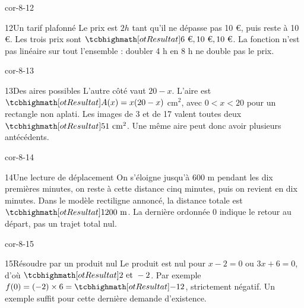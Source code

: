 \begin{blocLivre}{cor-8-12}\begin{corrige}{12}{Un tarif plafonné}
Le prix est $2h$ tant qu’il ne dépasse pas 10 €, puis reste à 10 €. Les trois prix sont $\res{6\text{ €},10\text{ €},10\text{ €}}$. La fonction n’est pas linéaire sur tout l’ensemble : doubler 4 h en 8 h ne double pas le prix.
\end{corrige}\end{blocLivre}
\begin{blocLivre}{cor-8-13}\begin{corrige}{13}{Des aires possibles}
L’autre côté vaut $20-x$. L’aire est $\res{A(x)=x(20-x)}$ cm$^2$, avec $0<x<20$ pour un rectangle non aplati. Les images de 3 et de 17 valent toutes deux $\res{51\text{ cm}^2}$. Une même aire peut donc avoir plusieurs antécédents.
\label{fig-cor-8-13}
\end{corrige}\end{blocLivre}
\begin{blocLivre}{cor-8-14}\begin{corrige}{14}{Une lecture de déplacement}
On s’éloigne jusqu’à 600 m pendant les dix premières minutes, on reste à cette distance cinq minutes, puis on revient en dix minutes. Dans le modèle rectiligne annoncé, la distance totale est $\res{1200\text{ m}}$. La dernière ordonnée 0 indique le retour au départ, pas un trajet total nul.
\label{fig-cor-8-14}
\end{corrige}\end{blocLivre}
\begin{blocLivre}{cor-8-15}\begin{corrige}{15}{Résoudre par un produit nul}
Le produit est nul pour $x-2=0$ ou $3x+6=0$, d’où $\res{2\text{ et }-2}$. Par exemple $f(0)=(-2)\times6=\res{-12}$, strictement négatif. Un exemple suffit pour cette dernière demande d’existence.
\end{corrige}\end{blocLivre}
